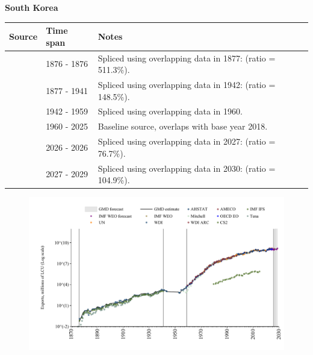 \documentclass[12pt,a4paper,landscape]{article}
\begin{document}
\begin{adjustbox}{max totalsize={\paperwidth}{\paperheight},center}
\begin{minipage}[t][\textheight][t]{\textwidth}
\begin{figure}[H]
\end{figure}
\end{minipage}
\end{adjustbox}
\begin{adjustbox}{max totalsize={\paperwidth}{\paperheight},center}
\begin{minipage}[t][\textheight][t]{\textwidth}
\vspace*{0.5cm}
{}
\begin{center}
{\Large\bfseries South Korea}
\end{center}
\vspace{0.5cm}
\begin{table}[H]
\centering
\small
\begin{tabular}{|l|l|l|}
\hline
\textbf{Source} & \textbf{Time span} & \textbf{Notes} \\
\hline
\rowcolor{white}\cite{Tena}& 1876 - 1876 &Spliced using overlapping data in 1877: (ratio = 511.3\%).\\
\rowcolor{lightgray}\cite{CS2_KOR}& 1877 - 1941 &Spliced using overlapping data in 1942: (ratio = 148.5\%).\\
\rowcolor{white}\cite{AHSTAT}& 1942 - 1959 &Spliced using overlapping data in 1960.\\
\rowcolor{lightgray}\cite{OECD_EO}& 1960 - 2025 &Baseline source, overlaps with base year 2018.\\
\rowcolor{white}\cite{AMECO}& 2026 - 2026 &Spliced using overlapping data in 2027: (ratio = 76.7\%).\\
\rowcolor{lightgray}\cite{IMF_WEO_forecast}& 2027 - 2029 &Spliced using overlapping data in 2030: (ratio = 104.9\%).\\
\hline
\end{tabular}
\end{table}
\begin{figure}[H]
\centering
\includegraphics[width=\textwidth,height=0.6\textheight,keepaspectratio]{graphs/KOR_exports.pdf}
\end{figure}
\end{minipage}
\end{adjustbox}
\end{document}
